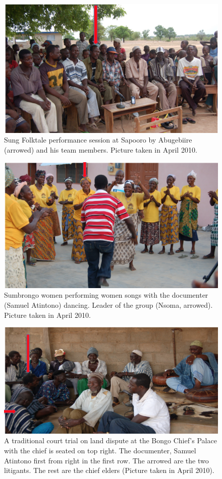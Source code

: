 \documentclass[output=paper,colorlinks,citecolor=brown]{langscibook}
\begin{document}
\begin{figure}
\includegraphics[width=\textwidth]{figures/abugebiire.png}
\caption{Sung Folktale performance session at Sapooro by Abugebiire (arrowed) and his team members. Picture taken in April 2010.}
\end{figure}


\begin{figure}
\includegraphics[width=\textwidth]{figures/sumbrongo.png}
\caption{Sumbrongo women performing women songs with the documenter (Samuel Atintono) dancing. Leader of the group (Nsoma, arrowed). Picture taken in April 2010.}
\end{figure}

\begin{figure}
\includegraphics[width=\textwidth]{figures/bongo.png}
\caption{A traditional court trial on land dispute at the Bongo Chief’s Palace with the chief is seated 
 	on top right. The documenter, Samuel Atintono first from right in the first row. The arrowed are the 
 	two litigants. The rest are the chief elders (Picture taken in April 2010).}
\end{figure}
\end{document}
